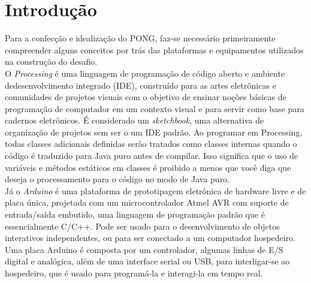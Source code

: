 \documentclass[11pt, a4paper, twocolumn]{article}
\begin{document}
\section{Introdução}
    Para a confecção e idealização do PONG, faz-se necessário primeiramente compreender alguns conceitos por 
    trás das plataformas e equipamentos utilizados na construção do desafio.
    \\
    O \textit{Processing} é uma linguagem de programação de código aberto e ambiente dedesenvolvimento integrado 
    (IDE), construído para as artes eletrônicas e comunidades de projetos visuais com o objetivo de 
    ensinar noções básicas de programação de computador em um contexto visual e para servir como base para 
    cadernos eletrônicos. É considerado um \textit{sketchbook}, uma alternativa de organização de 
    projetos sem ser o um IDE padrão. Ao programar em Processing, todas classes adicionais definidas serão
    tratados como classes internas quando o código é traduzido para Java puro antes de
    compilar. Isso significa que o uso de variáveis e métodos estáticos em classes é proibido
    a menos que você diga que deseja o processamento para o código no modo de Java puro.
    \\
    Já o \textit{Arduino} é uma plataforma de prototipagem eletrônica de hardware livre e de placa única,
    projetada com um microcontrolador Atmel AVR com suporte de entrada/saída embutido, uma
    linguagem de programação padrão que é essencialmente C/C++. 
    Pode ser usado para o desenvolvimento de objetos interativos independentes, ou para ser
    conectado a um computador hospedeiro. Uma placa Arduino é composta por um controlador,
    algumas linhas de E/S digital e analógica, além de uma interface serial ou USB, para
    interligar-se ao hospedeiro, que é usado para programá-la e interagi-la em tempo real.
\end{document}
